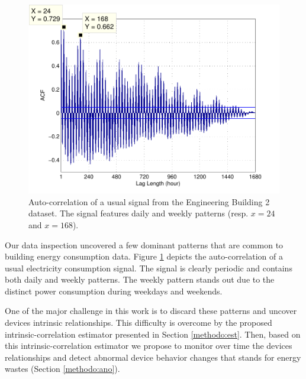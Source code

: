 \begin{figure}[t!]
\includegraphics[width=.5\textwidth]{img/acf_101A1_GHP-eps-converted-to.pdf}
\caption{Auto-correlation of a usual signal from the Engineering Building 2 dataset.
The signal features daily and weekly patterns (resp. $x=24$ and $x=168$).}
\label{fig:autocorr}
\end{figure}

Our data inspection uncovered a few dominant patterns that are common to building energy consumption data.
Figure \ref{fig:autocorr} depicts the auto-correlation of a usual electricity consumption signal.
The signal is clearly periodic and contains both daily and weekly patterns.
The weekly pattern stands out due to the distinct power consumption during weekdays and weekends.

One of the major challenge in this work is to discard these patterns and uncover devices intrinsic relationships.
This difficulty is overcome by the proposed intrinsic-correlation estimator presented in Section \ref{methodo:est}.
Then, based on this intrinsic-correlation estimator we propose to monitor over time the devices relationships and detect abnormal device behavior changes that stands for energy wastes (Section \ref{methodo:ano}).
